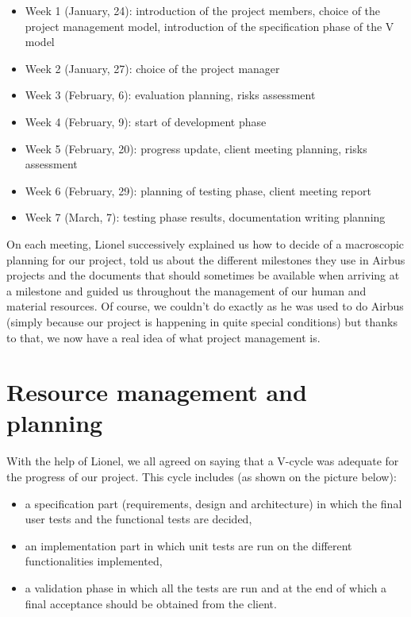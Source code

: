 \documentclass{report}
\begin{document}
\begin{itemize}


	\item Week 1 (January, 24): introduction of the project members, choice of the project management model, introduction of the specification phase of the V model
	\item Week 2 (January, 27): choice of the project manager
	\item Week 3 (February, 6): evaluation planning, risks assessment
	\item Week 4 (February, 9): start of development phase
	\item Week 5 (February, 20): progress update, client meeting planning, risks assessment
	\item Week 6 (February, 29): planning of testing phase, client meeting report
	\item Week 7 (March, 7): testing phase results, documentation writing planning

\end{itemize}

On each meeting, Lionel successively explained us how to decide of a macroscopic planning for our project, told us about the different milestones they use in Airbus projects and the documents that should sometimes be available when arriving at a milestone and guided us throughout the management of our human and material resources. Of course, we couldn't do exactly as he was used to do Airbus (simply because our project is happening in quite special conditions) but thanks to that, we now have a real idea of what project management is.

\section{Resource management and planning}

With the help of Lionel, we all agreed on saying that a V-cycle was adequate for the progress of our project. This cycle includes (as shown on the picture below):

\begin{itemize}
	\item a specification part (requirements, design and architecture) in which the final user tests and the functional tests are decided,
	\item an implementation part in which unit tests are run on the different functionalities implemented,
	\item a validation phase in which all the tests are run and at the end of which a final acceptance should be obtained from the client.
\end{itemize}
\end{document}
